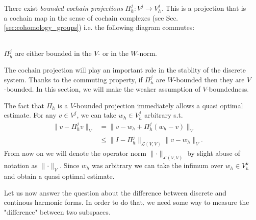 \documentclass[../master_thesis.tex]{subfiles}
\begin{document}
\begin{assumption}
    There exist  \textit{bounded cochain projections} $\Pi^j_h : V^j \rightarrow V^j_h$. 
    This is a projection that is a cochain map in the sense of cochain complexes 
    (see Sec.\,\ref{sec:cohomology_groups}) i.e. 
    the following diagram commutes: 
    \\
    \\   
    $\Pi^j_h$ are either bounded in the $V$- or in the $W$-norm. 
\end{assumption}
The cochain projection will play an important 
role in the stablity of the discrete system. 
Thanks to the commuting property, if $\Pi^j_h$ are $W$-bounded then they are $V$-bounded. 
In this section, we will make 
the weaker assumption of $V$-boundedness.

The fact that $\Pi_h$ is a $V$-bounded projection immediately allows a quasi 
optimal estimate. For any $v \in V^j$,  we can take 
$w_h \in V^j_h$ arbitrary s.t.
\begin{align}
    \lVert v - \Pi^j_h v \rVert _V
    &=  \lVert v - w_h  + \Pi^j_h  (w_h - v) \rVert _V
    \\ &\leq \lVert I - \Pi^j_h\rVert _{\mathcal{L}(V,V)} \lVert v - w_h \rVert _V. 
    \label{eq:bound_projection}
\end{align}
From now on we will denote the operator norm $\lVert \cdot \rVert _{\mathcal{L}(V,V)}$ 
by slight abuse of notation as $\lVert \cdot \rVert _V$.
Since $w_h$ was arbitrary we can take the infimum over $w_h \in V_h^k$ and obtain 
a quasi optimal estimate. 

Let us now answer the question about the difference between discrete and continous 
harmonic forms. In order to do that, we need some way to measure the "difference" 
between two subspaces. 
\end{document}
